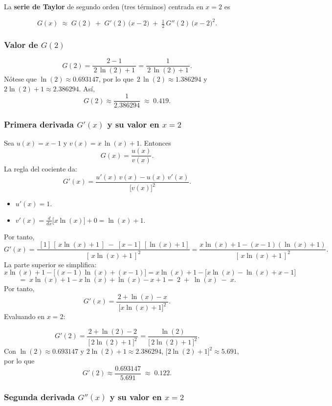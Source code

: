 La \textbf{serie de Taylor} de segundo orden (tres términos) centrada en \(x=2\) es

\[
G(x)\;\approx\;G(2)
\;+\;G'(2)\,\bigl(x-2\bigr)
\;+\;\tfrac12\,G''(2)\,\bigl(x-2\bigr)^{2}.
\]

\subsubsection{Valor de \(G(2)\)}

\[
G(2)
=\frac{2-1}{\,2\,\ln(2)+1\,}
=\frac{1}{\,2\,\ln(2)+1\,}.
\]
Nótese que \(\ln(2)\approx 0.693147\), por lo que  
\(\,2\,\ln(2)\approx 1.386294\) y \(2\ln(2)+1\approx 2.386294\).  
Así,
\[
G(2)\approx \frac{1}{2.386294}\;\approx\;0.419.
\]

\subsubsection{Primera derivada \(G'(x)\) y su valor en \(x=2\)}

Sea \(u(x)=x-1\) y \(v(x)=x\,\ln(x)+1\). Entonces 
\[
G(x)=\frac{u(x)}{v(x)}.
\]
La regla del cociente da:
\[
G'(x)
=\frac{u'(x)\,v(x)-u(x)\,v'(x)}{\bigl[v(x)\bigr]^2}.
\]

\begin{itemize}
    \item \(u'(x)=1.\)  
    \item \(v'(x)=\tfrac{d}{dx}\bigl[x\ln(x)\bigr]+0=\ln(x)+1.\)
\end{itemize}

Por tanto,
\[
G'(x)
=\frac{\;[1]\,[\,x\ln(x)+1\,]\;-\;[x-1]\,[\ln(x)+1]}{[\,x\ln(x)+1\,]^2}
=\frac{x\ln(x)+1 - (x-1)(\ln(x)+1)}{[\,x\ln(x)+1\,]^2}.
\]
La parte superior se simplifica:
\[
x\ln(x)+1 
-\bigl[(x-1)\ln(x)+(x-1)\bigr]
= x\ln(x)+1 - \bigl[x\ln(x)-\ln(x)+x-1\bigr]
\]
\[
=\;x\ln(x)+1 
- x\ln(x) + \ln(x) - x + 1
=\;2\;+\;\ln(x)\;-\;x.
\]
Por tanto,
\[
G'(x)=\frac{\,2 + \ln(x) - x\,}{\bigl[x\ln(x)+1\bigr]^2}.
\]
Evaluando en \(x=2\):

\[
G'(2)
=\frac{\,2 + \ln(2) - 2\,}{\bigl[\,2\ln(2)+1\,\bigr]^2}
=\frac{\ln(2)}{\bigl[\,2\ln(2)+1\,\bigr]^2}.
\]
Con \(\ln(2)\approx 0.693147\) y \(2\ln(2)+1\approx 2.386294\),  
\(\bigl[2\ln(2)+1\bigr]^2\approx 5.691,\)  
por lo que 
\[
G'(2)\approx \frac{0.693147}{5.691}\;\approx\;0.122.
\]

\subsubsection{Segunda derivada \(G''(x)\) y su valor en \(x=2\)}

